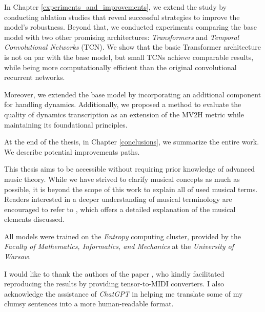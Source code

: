 In Chapter \ref{experiments_and_improvements}, we extend the study by conducting ablation studies that reveal successful strategies to improve the model's robustness. Beyond that, we conducted experiments comparing the base model with two other promising architectures: \emph{Transformers} and \emph{Temporal Convolutional Networks} (TCN). We show that the basic Transformer architecture is not on par with the base model, but small TCNs achieve comparable results, while being more computationally efficient than the original convolutional recurrent networks.
 
Moreover, we extended the base model by incorporating an additional component for handling dynamics. Additionally, we proposed a method to evaluate the quality of dynamics transcription as an extension of the MV2H metric while maintaining its foundational principles. 

At the end of the thesis, in Chapter \ref{conclusions}, we summarize the entire work. We describe potential improvements paths.

This thesis aims to be accessible without requiring prior knowledge of advanced music theory. While we have strived to clarify musical concepts as much as possible, it is beyond the scope of this work to explain all of used musical terms. Readers interested in a deeper understanding of musical terminology are encouraged to refer to \cite{Read1969}, which offers a detailed explanation of the musical elements discussed.

All models were trained on the \emph{Entropy} computing cluster, provided by the \emph{Faculty of Mathematics, Informatics, and Mechanics} at the \emph{University of Warsaw}.

I would like to thank the authors of the paper \cite{Liu2022}, who kindly facilitated reproducing the results by providing tensor-to-MIDI converters. I also acknowledge the assistance of \emph{ChatGPT} in helping me translate some of my clumsy sentences into a more human-readable format.
